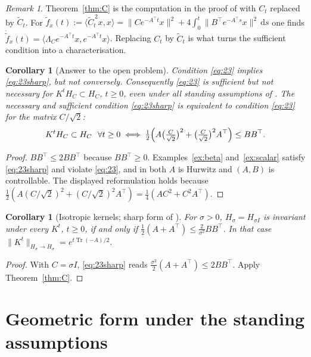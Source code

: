 \documentclass[11pt]{article}
\newtheorem{corollary}[lemma]{Corollary}
\theoremstyle{definition}
\theoremstyle{remark}
\newtheorem{remark}[lemma]{Remark}
\newcommand{\Tr}{\operatorname{Tr}}
\newcommand{\dd}{\,\mathrm{d}}
\newcommand{\Ct}{\widetilde{C}_t}
\newcommand{\ip}[2]{\langle #1,#2\rangle}
\newcommand{\tp}{\top}
\begin{document}
\begin{remark}
Theorem~\ref{thm:C} is the computation in the proof of \cite[Theorem~2.1]{PSWPN} with $C_t$ replaced by $\Ct$. For
$\widetilde f_x(t):=\ip{\Ct^{\,2}x}x=\|Ce^{-A^\tp t}x\|^2+4\int_0^t\|B^\tp e^{-A^\tp s}x\|^2\dd s$ one finds
$\dot{\widetilde f}_x(t)=\ip{\Lambda_Ce^{-A^\tp t}x}{e^{-A^\tp t}x}$. Replacing $C_t$ by $\Ct$ is what turns the
sufficient condition into a characterisation.
\end{remark}

\begin{corollary}[Answer to the open problem]\label{cor:answer}
Condition \eqref{eq:23} implies \eqref{eq:23sharp}, but not conversely. Consequently \eqref{eq:23} is sufficient but
\emph{not necessary} for $K^tH_C\subset H_C$, $t\ge0$, even under all standing assumptions of \cite{PSWPN}. The
necessary and sufficient condition \eqref{eq:23sharp} is equivalent to condition \eqref{eq:23} for the matrix $C/\sqrt2$:
\[
K^tH_C\subset H_C\ \ \forall t\ge0\iff\tfrac12\Bigl(A\bigl(\tfrac{C}{\sqrt2}\bigr)^2+\bigl(\tfrac{C}{\sqrt2}\bigr)^2A^\tp\Bigr)\le BB^\tp .
\]
\end{corollary}

\begin{proof}
$BB^\tp\le2BB^\tp$ because $BB^\tp\ge0$. Examples~\ref{ex:beta} and~\ref{ex:scalar} satisfy \eqref{eq:23sharp} and violate
\eqref{eq:23}, and in both $A$ is Hurwitz and $(A,B)$ is controllable. The displayed reformulation holds because
$\frac12(A(C/\sqrt2)^2+(C/\sqrt2)^2A^\tp)=\frac14(AC^2+C^2A^\tp)$.
\end{proof}

\begin{corollary}[Isotropic kernels; sharp form of {\cite[Corollary~2.3]{PSWPN}}]\label{cor:iso}
For $\sigma>0$, $H_\sigma=H_{\sigma I}$ is invariant under every $K^t$, $t\ge0$, if and only if
$\frac12(A+A^\tp)\le\frac{2}{\sigma^2}BB^\tp$. In that case $\|K^t\|_{H_\sigma\to H_\sigma}=e^{t\Tr(-A)/2}$.
\end{corollary}

\begin{proof}
With $C=\sigma I$, \eqref{eq:23sharp} reads $\frac{\sigma^2}2(A+A^\tp)\le2BB^\tp$. Apply Theorem~\ref{thm:C}.
\end{proof}

\section{Geometric form under the standing assumptions}\label{sec:geometry}
\end{document}

